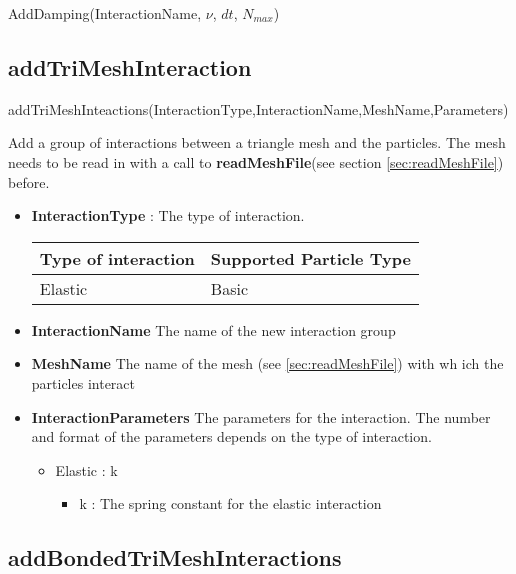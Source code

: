 \documentclass{report}
\begin{document}
\textsf{AddDamping(InteractionName, $\nu$, $dt$, $N_{max}$)}
\par \medskip

\subsection{addTriMeshInteraction}

\textsf{addTriMeshInteactions(InteractionType,InteractionName,MeshName,Parameters)}
\par\medskip
Add a group of interactions between a triangle mesh and the particles. The mesh needs to be read in with a call to \textbf{readMeshFile}(see section \ref{sec:readMeshFile}) before.

\begin{itemize}
\item \textbf{InteractionType} : The type of interaction. \par
\begin{tabular}{|l|l|}
\hline
Type of interaction & Supported Particle Type \\
\hline
\hline
Elastic & Basic \\
\hline
\end{tabular}

\item \textbf{InteractionName} The name of the new interaction group
\item \textbf{MeshName} The name of the mesh (see \ref{sec:readMeshFile}) with wh ich the particles interact
\item \textbf{InteractionParameters} The parameters for the interaction. The number and format of the parameters depends on the type of interaction.
\begin{itemize}
\item Elastic : k
\begin{itemize}
\item k : The spring constant for the elastic interaction
\end{itemize} %

\end{itemize} %


\end{itemize}

\subsection{addBondedTriMeshInteractions}
\end{document}
